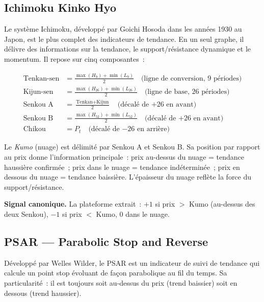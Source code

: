 \subsection{Ichimoku Kinko Hyo}

Le système Ichimoku, développé par Goichi Hosoda dans les années 1930 au Japon, est
le plus complet des indicateurs de tendance. En un seul graphe, il délivre des
informations sur la tendance, le support/résistance dynamique et le momentum.
Il repose sur cinq composantes~:

\begin{align}
    \text{Tenkan-sen}  &= \frac{\max(H_{9}) + \min(L_{9})}{2}
        \quad \text{(ligne de conversion, 9 périodes)} \label{eq:tenkan} \\[4pt]
    \text{Kijun-sen}   &= \frac{\max(H_{26}) + \min(L_{26})}{2}
        \quad \text{(ligne de base, 26 périodes)} \label{eq:kijun} \\[4pt]
    \text{Senkou A}    &= \frac{\text{Tenkan} + \text{Kijun}}{2}
        \quad \text{(décalé de +26 en avant)} \label{eq:senkou_a} \\[4pt]
    \text{Senkou B}    &= \frac{\max(H_{52}) + \min(L_{52})}{2}
        \quad \text{(décalé de +26 en avant)} \label{eq:senkou_b} \\[4pt]
    \text{Chikou}      &= P_t
        \quad \text{(décalé de $-26$ en arrière)} \label{eq:chikou}
\end{align}

Le \textit{Kumo} (nuage) est délimité par Senkou A et Senkou B. Sa position par
rapport au prix donne l'information principale~: prix au-dessus du nuage = tendance
haussière confirmée~; prix dans le nuage = tendance indéterminée~; prix en dessous
du nuage = tendance baissière. L'épaisseur du nuage reflète la force du support/résistance.

\textbf{Signal canonique.} La plateforme extrait~: $+1$ si prix $>$ Kumo (au-dessus
des deux Senkou), $-1$ si prix $<$ Kumo, $0$ dans le nuage.

\subsection{PSAR — Parabolic Stop and Reverse}

Développé par Welles Wilder, le PSAR est un indicateur de suivi de tendance qui
calcule un point stop évoluant de façon parabolique au fil du temps. Sa particularité~:
il est toujours soit au-dessus du prix (trend baissier) soit en dessous (trend haussier).

